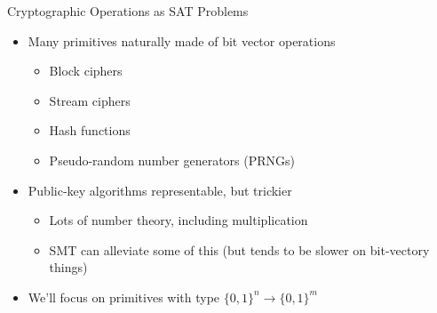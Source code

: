 \documentclass[ignorenonframetext,]{beamer}
\providecommand{\tightlist}{%
  \setlength{\itemsep}{0pt}\setlength{\parskip}{0pt}}
\begin{document}
\begin{frame}{Cryptographic Operations as SAT Problems}

\begin{itemize}
\tightlist
\item
  Many primitives naturally made of bit vector operations

  \begin{itemize}
  \tightlist
  \item
    Block ciphers
  \item
    Stream ciphers
  \item
    Hash functions
  \item
    Pseudo-random number generators (PRNGs)
  \end{itemize}
\item
  Public-key algorithms representable, but trickier

  \begin{itemize}
  \tightlist
  \item
    Lots of number theory, including multiplication
  \item
    SMT can alleviate some of this (but tends to be slower on
    bit-vectory things)
  \end{itemize}
\item
  We'll focus on primitives with type
  \(\{0,1\}^{n} \rightarrow \{0,1\}^{m}\)
\end{itemize}

\end{frame}
\end{document}
